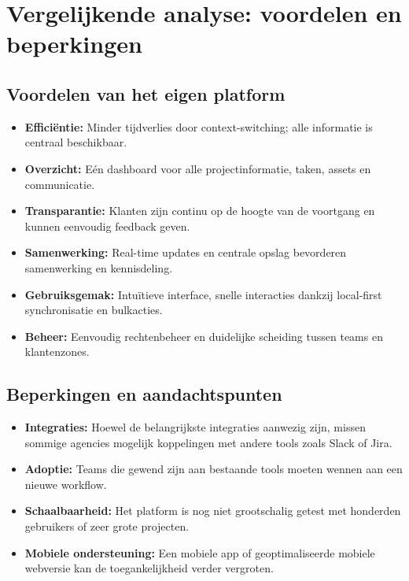 \section{Vergelijkende analyse: voordelen en beperkingen}
\label{sec:casus-analyse}

\subsection{Voordelen van het eigen platform}
\begin{itemize}
    \item \textbf{Efficiëntie:} Minder tijdverlies door context-switching; alle informatie is centraal beschikbaar.
    \item \textbf{Overzicht:} Eén dashboard voor alle projectinformatie, taken, assets en communicatie.
    \item \textbf{Transparantie:} Klanten zijn continu op de hoogte van de voortgang en kunnen eenvoudig feedback geven.
    \item \textbf{Samenwerking:} Real-time updates en centrale opslag bevorderen samenwerking en kennisdeling.
    \item \textbf{Gebruiksgemak:} Intuïtieve interface, snelle interacties dankzij local-first synchronisatie en bulkacties.
    \item \textbf{Beheer:} Eenvoudig rechtenbeheer en duidelijke scheiding tussen teams en klantenzones.
\end{itemize}

\subsection{Beperkingen en aandachtspunten}
\begin{itemize}
    \item \textbf{Integraties:} Hoewel de belangrijkste integraties aanwezig zijn, missen sommige agencies mogelijk koppelingen met andere tools zoals Slack of Jira.
    \item \textbf{Adoptie:} Teams die gewend zijn aan bestaande tools moeten wennen aan een nieuwe workflow.
    \item \textbf{Schaalbaarheid:} Het platform is nog niet grootschalig getest met honderden gebruikers of zeer grote projecten.
    \item \textbf{Mobiele ondersteuning:} Een mobiele app of geoptimaliseerde mobiele webversie kan de toegankelijkheid verder vergroten.
\end{itemize}

